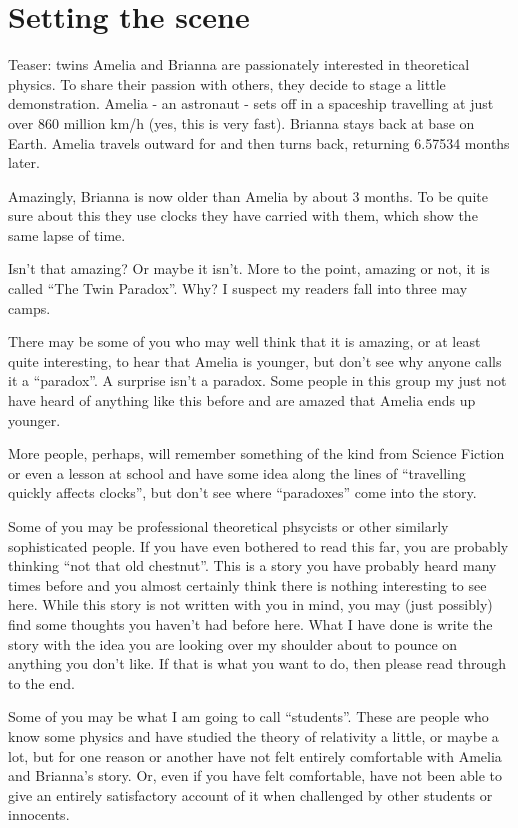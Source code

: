 \documentclass[a4paper]{report}
\begin{document}
\section*{Setting the scene}
Teaser: twins Amelia and Brianna are passionately interested in theoretical physics. To share their passion with others, they decide to stage a little demonstration. Amelia - an astronaut - sets off in a spaceship travelling at just over 860 million km/h (yes, this is very fast). Brianna stays back at base on Earth. Amelia travels outward for and then turns back, returning 6.57534 months later. 

Amazingly, Brianna is now older than Amelia by about 3 months. To be quite sure about this they use clocks they have carried with them, which show the same lapse of time.

Isn't that amazing? Or maybe it isn't. More to the point, amazing or not, it is called ``The Twin Paradox''. Why? I suspect my readers fall into three may camps.

There may be some of you who may well think that it is amazing, or at least quite interesting, to hear that Amelia is younger, but don't see why anyone calls it a ``paradox''. A surprise isn't a paradox. Some people in this group my just not have heard of anything like this before and are amazed that Amelia ends up younger.

More people, perhaps, will remember something of the kind from Science Fiction or even a lesson at school and have some idea along the lines of ``travelling quickly affects clocks'', but don't see where ``paradoxes'' come into the story.

Some of you may be professional theoretical phsycists or other similarly sophisticated people. If you have even bothered to read this far, you are probably thinking ``not that old chestnut''. This is a story you have probably heard many times before and you almost certainly think there is nothing interesting to see here. While this story is not written with you in mind, you may (just possibly) find some thoughts you haven't had before here. What I have done is write the story with the idea you are looking over my shoulder about to pounce on anything you don't like. If that is what you want to do, then please read through to the end.

Some of you may be what I am going to call ``students''. These are people who know some physics and have studied the theory of relativity a little, or maybe a lot, but for one reason or another have not felt entirely comfortable with Amelia and Brianna's story. Or, even if you have felt comfortable, have not been able to give an entirely satisfactory account of it when challenged by other students or innocents.
\end{document}
